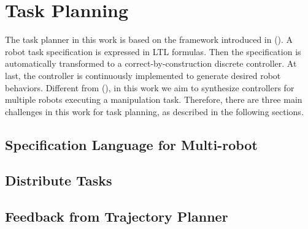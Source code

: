 \section{Task Planning}
The task planner in this work is based on the framework introduced in ().
A robot task specification is expressed in LTL formulas.
Then the specification is automatically transformed to a correct-by-construction discrete controller.
At last, the controller is continuously implemented to generate desired robot behaviors.
Different from (), in this work we aim to synthesize controllers for multiple robots executing a manipulation task.
Therefore, there are three main challenges in this work for task planning, as described in the following sections.

\subsection{Specification Language for Multi-robot}



\subsection{Distribute Tasks}

\subsection{Feedback from Trajectory Planner}

